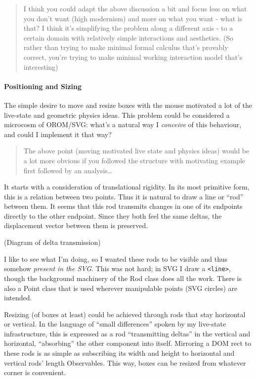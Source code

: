 \documentclass[english,submission]{programming}
\begin{document}
\begin{quote}
I think you could adapt the above discussion a bit and focus less on
what you don't want (high modernism) and more on what you want - what is
that? I think it's simplifying the problem along a different axis - to a
certain domain with relatively simple interactions and aesthetics. (So
rather than trying to make minimal formal calculus that's provably
correct, you're trying to make minimal working interaction model that's
interesting)
\end{quote}

\hypertarget{positioning-and-sizing}{%
\paragraph{Positioning and Sizing}\label{positioning-and-sizing}}

The simple desire to move and resize boxes with the mouse motivated a
lot of the live-state and geometric physics ideas. This problem could be
considered a microcosm of OROM/SVG: what's a natural way I
\emph{conceive} of this behaviour, and could I implement it that way?

\begin{quote}
The above point (moving motivated live state and physics ideas) would be
a lot more obvious if you followed the structure with motivating example
first followed by an analysis\ldots{}
\end{quote}

It starts with a consideration of translational rigidity. In its most
primitive form, this is a relation between two points. Thus it is
natural to draw a line or ``rod'' between them. It seems that this rod
transmits changes in one of its endpoints directly to the other
endpoint. Since they both feel the same deltas, the displacement vector
between them is preserved.

(Diagram of delta transmission)

I like to see what I'm doing, so I wanted these rods to be visible and
thus somehow \emph{present in the SVG}. This was not hard; in SVG I draw
a \texttt{\textless{}line\textgreater{}}, though the background
machinery of the Rod class does all the work. There is also a Point
class that is used wherever manipulable points (SVG circles) are
intended.

Resizing (of boxes at least) could be achieved through rods that stay
horizontal or vertical. In the language of ``small differences'' spoken
by my live-state infrastructure, this is expressed as a rod
``transmitting deltas'' in the vertical and horizontal, ``absorbing''
the other component into itself. Mirroring a DOM rect to these rods is
as simple as subscribing its width and height to horizontal and vertical
rods' length Observables. This way, boxes can be resized from whatever
corner is convenient.
\end{document}
